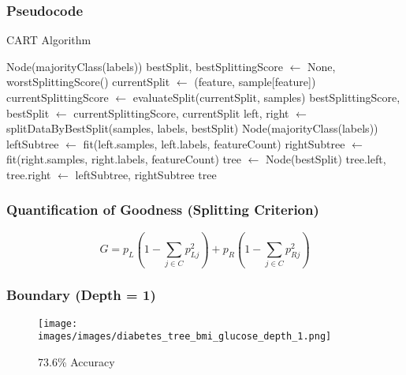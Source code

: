 \documentclass[10pt]{beamer}
\begin{document}
\begin{frame}
	\frametitle{Pseudocode}
	
	\begin{algorithm}[H]
		\tiny
		\caption{CART Algorithm \citep{breiman}}
	\begin{algorithmic}[1]
			\State \Return Node(majorityClass(labels)) 
		\EndIf
		\State bestSplit, bestSplittingScore $\gets$ None, worstSplittingScore()
				\State currentSplit $\gets$ (feature, sample[feature])
				\State currentSplittingScore $\gets$ evaluateSplit(currentSplit, samples)
					\State bestSplittingScore, bestSplit  $\gets$ currentSplittingScore, currentSplit
				\EndIf
			\EndFor
		\EndFor
		\State left, right $\gets$ splitDataByBestSplit(samples, labels, bestSplit)
			\State \Return Node(majorityClass(labels)) 
		\EndIf
		\State leftSubtree $\gets$ fit(left.samples, left.labels, featureCount)
		\State rightSubtree $\gets$ fit(right.samples, right.labels, featureCount)
		\State tree $\gets$ Node(bestSplit)
		\State tree.left, tree.right $\gets$ leftSubtree, rightSubtree
		\State \Return tree
	\EndFunction
	\end{algorithmic}
	\end{algorithm}

\end{frame}

\begin{frame}
	\frametitle{Quantification of Goodness (Splitting Criterion)}

	\begin{equation*}
		G = p_L \left(1 - \sum_{j\in C} p_{Lj}^2 \right) + p_R \left(1 - \sum_{j \in C} p_{Rj}^2 \right)
		\label{gini_equ}
	\end{equation*}

\end{frame}



\begin{frame}
	\frametitle{Boundary (Depth = 1)}
	\begin{figure}[h]
		\centering
		\texttt{[image: images/images/diabetes\_tree\_bmi\_glucose\_depth\_1.png]}
		\caption{73.6\% Accuracy}
	\end{figure}
\end{frame}
\end{document}
